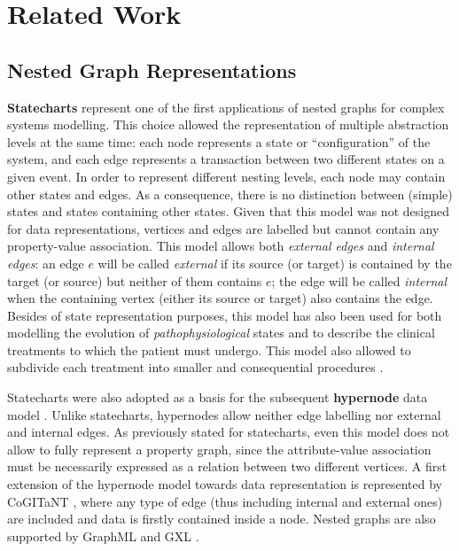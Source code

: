 \section{Related Work}

\subsection{Nested Graph Representations}
\textbf{Statecharts} \cite{statecharts} represent one of the first applications of nested graphs for complex systems modelling. This choice allowed the representation of multiple abstraction levels at the same time: each node represents a  state or ``configuration'' of the system, and each edge represents a transaction between two different states on a given event. In order to represent different nesting levels, each node may contain other states and edges. As a consequence,  there is no distinction between (simple) states and states containing other states. Given that this model was not designed for data representations, vertices and edges are labelled but cannot contain any property-value association. 
This model allows both \textit{external edges} and \textit{internal edges}: an edge  $e$ will be called \textit{external} if its source (or target) is contained by the target (or source) but neither of them contains $e$; the edge will be called \textit{internal} when the containing vertex (either its source or target) also contains the edge. Besides of state representation purposes, this model has also been  used for both modelling the evolution of \textit{pathophysiological} states and to describe the clinical treatments to which the patient must undergo. This model also allowed to subdivide each treatment  into smaller and consequential procedures \cite{NestedGlaucoma}.

Statecharts were also adopted as a basis for the subsequent \textbf{hypernode} data model \cite{Poulovassilis1994}. Unlike statecharts, hypernodes allow neither edge labelling nor external and internal edges. As previously stated for statecharts, even this model does not allow to fully represent a property graph, since the attribute-value association must be necessarily expressed as a relation between two different vertices.  A first extension of the hypernode model towards data representation is represented by CoGITaNT \cite{GenestS98}, where any type of edge (thus including internal and external ones) are included and data is firstly contained inside a node. Nested graphs are also supported by GraphML \cite{graphml} and GXL \cite{GXL}.


